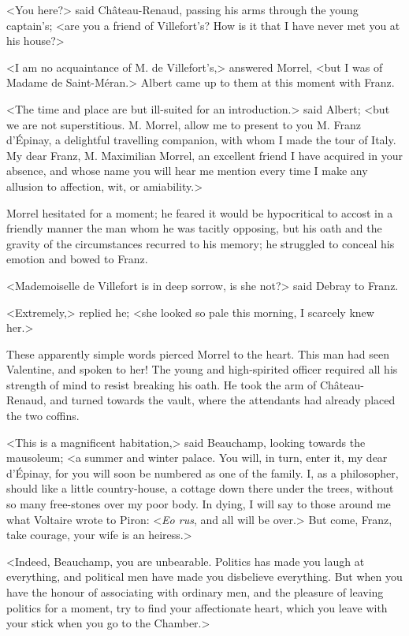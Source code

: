  <You here?> said Château-Renaud, passing his arms through the young captain's; <are you a friend of Villefort's? How is it that I have never met you at his house?> 

 <I am no acquaintance of M. de Villefort's,> answered Morrel, <but I was of Madame de Saint-Méran.> Albert came up to them at this moment with Franz. 

 <The time and place are but ill-suited for an introduction.> said Albert; <but we are not superstitious. M. Morrel, allow me to present to you M. Franz d'Épinay, a delightful travelling companion, with whom I made the tour of Italy. My dear Franz, M. Maximilian Morrel, an excellent friend I have acquired in your absence, and whose name you will hear me mention every time I make any allusion to affection, wit, or amiability.> 

 Morrel hesitated for a moment; he feared it would be hypocritical to accost in a friendly manner the man whom he was tacitly opposing, but his oath and the gravity of the circumstances recurred to his memory; he struggled to conceal his emotion and bowed to Franz. 

 <Mademoiselle de Villefort is in deep sorrow, is she not?> said Debray to Franz. 

 <Extremely,> replied he; <she looked so pale this morning, I scarcely knew her.> 

 These apparently simple words pierced Morrel to the heart. This man had seen Valentine, and spoken to her! The young and high-spirited officer required all his strength of mind to resist breaking his oath. He took the arm of Château-Renaud, and turned towards the vault, where the attendants had already placed the two coffins. 

 <This is a magnificent habitation,> said Beauchamp, looking towards the mausoleum; <a summer and winter palace. You will, in turn, enter it, my dear d'Épinay, for you will soon be numbered as one of the family. I, as a philosopher, should like a little country-house, a cottage down there under the trees, without so many free-stones over my poor body. In dying, I will say to those around me what Voltaire wrote to Piron: <\textit{Eo rus}, and all will be over.> But come, Franz, take courage, your wife is an heiress.> 

 <Indeed, Beauchamp, you are unbearable. Politics has made you laugh at everything, and political men have made you disbelieve everything. But when you have the honour of associating with ordinary men, and the pleasure of leaving politics for a moment, try to find your affectionate heart, which you leave with your stick when you go to the Chamber.> 

